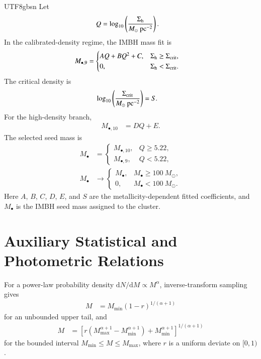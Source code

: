 \documentclass[trackchanges, twocolappendix, twocolumn]{aastex701}
\begin{document}
\begin{CJK*}{UTF8}{gbsn}
Let
\begin{align}
Q &= \log_{10}\left(\dfrac{\Sigma_{\rm h}}
{M_\odot~{\rm pc}^{-2}}\right).
\end{align}
In the calibrated-density regime, the IMBH mass fit is
\begin{align}
M_{\bullet,9} &=
\begin{cases}
AQ+BQ^2+C, & \Sigma_{\rm h}\geq\Sigma_{\rm crit},\\
0, & \Sigma_{\rm h}<\Sigma_{\rm crit}.
\end{cases}
\end{align}
The critical density is
\begin{align}
\log_{10}\left(\dfrac{\Sigma_{\rm crit}}
{M_\odot~{\rm pc}^{-2}}\right)
&= S.
\end{align}
For the high-density branch,
\begin{align}
M_{\bullet,10} &= DQ+E.
\end{align}
The selected seed mass is
\begin{align}
M_{\bullet} &=
\begin{cases}
M_{\bullet,10}, & Q\geq5.22,\\
M_{\bullet,9}, & Q<5.22,
\end{cases}\\
M_{\bullet} &\rightarrow
\begin{cases}
M_{\bullet}, & M_{\bullet}\geq100~M_\odot,\\
0, & M_{\bullet}<100~M_\odot.
\end{cases}
\end{align}
Here $A$, $B$, $C$, $D$, $E$, and $S$ are the metallicity-dependent fitted coefficients, and $M_{\bullet}$ is the IMBH seed mass assigned to the cluster.

\section{Auxiliary Statistical and Photometric Relations}
\label{app:auxiliary_equations}

For a power-law probability density $\mathrm{d}N/\mathrm{d}M\propto M^{\alpha}$, inverse-transform sampling gives
\begin{align}
M &= M_{\min}(1-r)^{1/(\alpha+1)}
\end{align}
for an unbounded upper tail, and
\begin{align}
M &=
\left[
r\left(M_{\max}^{\alpha+1}-M_{\min}^{\alpha+1}\right)
+M_{\min}^{\alpha+1}
\right]^{1/(\alpha+1)}
\end{align}
for the bounded interval $M_{\min}\leq M\leq M_{\max}$, where $r$ is a uniform deviate on $[0,1)$.


\end{CJK*}
\end{document}
